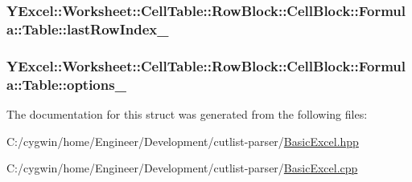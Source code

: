 \subsubsection[{last\+Row\+Index\+\_\+}]{ Y\+Excel\+::\+Worksheet\+::\+Cell\+Table\+::\+Row\+Block\+::\+Cell\+Block\+::\+Formula\+::\+Table\+::last\+Row\+Index\+\_\+}\label{struct_y_excel_1_1_worksheet_1_1_cell_table_1_1_row_block_1_1_cell_block_1_1_formula_1_1_table_af0bad48555d7b48e384ed69e906d6d1d}
\hypertarget{struct_y_excel_1_1_worksheet_1_1_cell_table_1_1_row_block_1_1_cell_block_1_1_formula_1_1_table_a0531a18c837a46286f46c913ad372448}{}
\subsubsection[{options\+\_\+}]{ Y\+Excel\+::\+Worksheet\+::\+Cell\+Table\+::\+Row\+Block\+::\+Cell\+Block\+::\+Formula\+::\+Table\+::options\+\_\+}\label{struct_y_excel_1_1_worksheet_1_1_cell_table_1_1_row_block_1_1_cell_block_1_1_formula_1_1_table_a0531a18c837a46286f46c913ad372448}


The documentation for this struct was generated from the following files\+:\begin{DoxyCompactItemize}
\item 
C\+:/cygwin/home/\+Engineer/\+Development/cutlist-\/parser/\hyperlink{_basic_excel_8hpp}{Basic\+Excel.\+hpp}\item 
C\+:/cygwin/home/\+Engineer/\+Development/cutlist-\/parser/\hyperlink{_basic_excel_8cpp}{Basic\+Excel.\+cpp}\end{DoxyCompactItemize}
